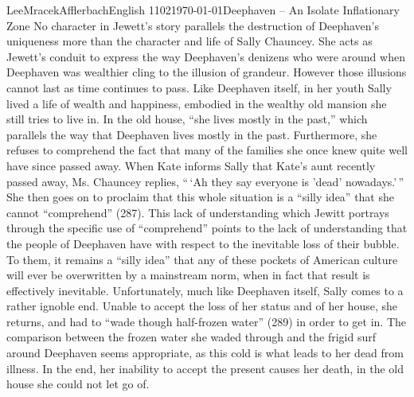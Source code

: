 \documentclass[12pt, letterpaper]{article}
\begin{document}
\begin{mla}{Lee}{Mracek}{Afflerbach}{English
1102}{\today}{Deephaven -- An Isolate Inflationary Zone}
No character in Jewett's story parallels the destruction of Deephaven's
uniqueness more than the character and life of Sally Chauncey. She acts as
Jewett's conduit to express the way Deephaven's denizens who were around when
Deephaven was wealthier cling to the illusion of grandeur. However those
illusions cannot last as time continues to pass. Like Deephaven itself, in her
youth Sally lived a life of wealth and happiness, embodied in the wealthy old
mansion she still tries to live in. In the old house, ``she lives mostly in the
past,'' which parallels the way that Deephaven lives mostly in the past.
Furthermore, she refuses to comprehend the fact that many of the families she
once knew quite well have since passed away. When Kate informs Sally that Kate's
aunt recently passed away, Ms. Chauncey replies, ``\,`Ah they say everyone is
'dead' nowadays.'\,'' She then goes on to proclaim that this whole situation is a
``silly idea'' that she cannot ``comprehend'' (287). This lack of understanding
which Jewitt portrays through the specific use of ``comprehend'' points to the
lack of understanding that the people of Deephaven have with respect to the
inevitable loss of their bubble. To them, it remains a ``silly idea'' that any
of these pockets of American culture will ever be overwritten by a mainstream
norm, when in fact that result is effectively inevitable. Unfortunately, much
like Deephaven itself, Sally comes to a rather ignoble end. Unable to accept the
loss of her status and of her house, she returns, and had to ``wade though
half-frozen water'' (289) in order to get in. The comparison between the frozen water
she waded through and the frigid surf around Deephaven seems appropriate, as
this cold is what leads to her dead from illness. In the end, her inability to
accept the present causes her death, in the old house she could not let go of.



\end{mla}
\end{document}
